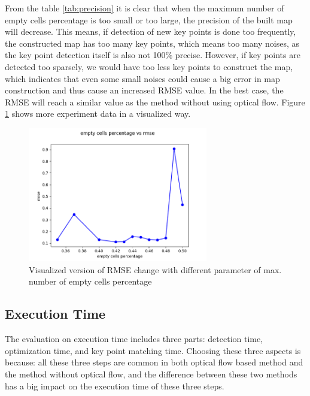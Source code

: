 \documentclass[11pt]{easychair}
\begin{document}
From the table \ref{tab:precision} it is clear that when the maximum number of empty cells percentage is too small or too large, the precision of the built map will decrease. This means, if detection of new key points is done too frequently, the constructed map has too many key points, which means too many noises, as the key point detection itself is also not 100\% precise. However, if key points are detected too sparsely, we would have too less key points to construct the map, which indicates that even some small noises could cause a big error in map construction and thus cause an increased RMSE value. In the best case, the RMSE will reach a similar value as the method without using optical flow. Figure \ref{fig:max_empty_cell} shows more experiment data in a visualized way.

\begin{figure}
	
	\centering
	\includegraphics[width=0.7\textwidth]{img/max_num_empty_cell1.png}
	\caption{Visualized version of RMSE change with different parameter of max. number of empty cells percentage}
	\label{fig:max_empty_cell}
	
\end{figure}


\subsection{Execution Time}
The evaluation on execution time includes three parts: detection time, optimization time, and key point matching time. Choosing these three aspects is because: all these three steps are common in both optical flow based method and the method without optical flow, and the difference between these two methods has a big impact on the execution time of these three steps.

\end{document}
